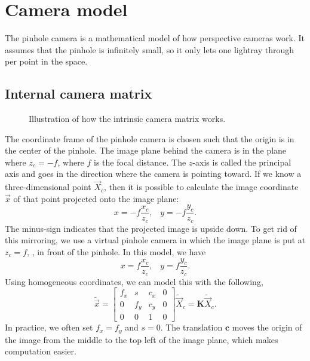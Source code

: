 \section{Camera model}

The pinhole camera is a mathematical model of how perspective cameras work.
It assumes that the pinhole is infinitely small, so it only lets one lightray
through per point in the space.

\subsection{Internal camera matrix}

\begin{figure}[ht]
    \centering
    \caption{Illustration of how the intrinsic camera matrix works.}
    \label{fig:internal-camera}
\end{figure}

The coordinate frame of the pinhole camera is chosen such that the origin is in
the center of the pinhole. The image plane behind the camera is in the plane
where $z_c=-f$, where $f$ is the focal distance. The $z$-axis is called the
principal axis and goes in the direction where the camera is pointing toward. If
we know a three-dimensional point $\vec{X}_c$, then it is possible to calculate
the image coordinate $\vec{x}$ of that point projected onto the image plane: \[
  x=-f\frac{x_c}{z_c}, \;\;\; y=-f\frac{y_c}{z_c}
.\]
The minus-sign indicates that the projected image is upside down. To get rid of
this mirroring, we use a virtual pinhole camera in which the image plane is put
at $z_c=f$, \ie, in front of the pinhole. In this model, we have \[
  x=f\frac{x_c}{z_c}, \;\;\; y=f\frac{y_c}{z_c}
.\]
Using homogeneous coordinates, we can model this with the following, \[
  \tilde{\vec{x}} = \begin{bmatrix} f_x & s & c_x & 0 \\ 0 & f_y & c_y & 0 \\ 0
  & 0 & 1 & 0 \end{bmatrix}\tilde{\vec{X}}_c = \bm{K}\tilde{\vec{X}}_c
.\]
In practice, we often set $f_x=f_y$ and $s=0$. The translation $\bm{c}$ moves
the origin of the image from the middle to the top left of the image plane,
which makes computation easier.

